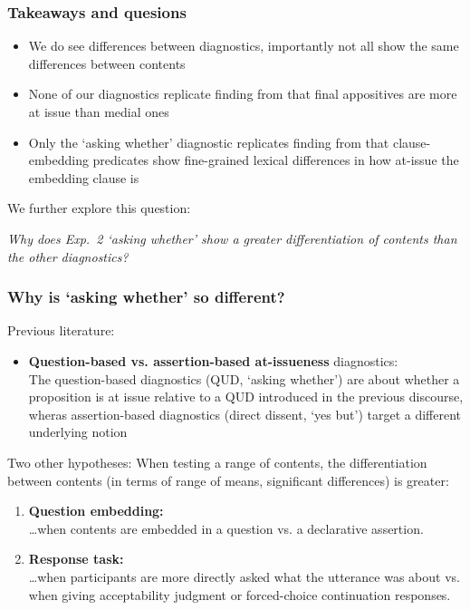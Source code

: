 \documentclass[compress, xcolor = dvipsnames, aspectratio=169, handout]{beamer}
\begin{document}
	\begin{frame}\frametitle{Takeaways and quesions}
		\begin{itemize}
			\item We do see differences between diagnostics, importantly not all show the same differences between contents

			\item None of our diagnostics replicate finding from \citet{syrett_experimental_2015} that final appositives are more at issue than medial ones

			\item Only the `asking whether' diagnostic replicates finding from \citealt{degen-tonhauser-glossa} that clause-embedding predicates show fine-grained lexical differences in how at-issue the embedding clause is

		\end{itemize}	\bigskip

		We further explore this question:

		\begin{center}
			\emph{Why does Exp.~2 `asking whether' show a greater differentiation of contents than the other diagnostics?}
		\end{center}
		
	\end{frame}

	\begin{frame}[t]\frametitle{Why is `asking whether' so different?}\small 
		Previous literature:
		\begin{itemize}
			\item \textbf{Question-based vs. assertion-based at-issueness} diagnostics:\\
				The question-based diagnostics (QUD, `asking whether') are about whether a proposition is at issue relative to a QUD introduced in the previous discourse, wheras assertion-based diagnostics (direct dissent, `yes but') target a different underlying notion
		\end{itemize}
		\vfill 

		Two other hypotheses: When testing a range of contents, the differentiation between contents (in terms of range of means, significant differences) is greater:
		\begin{enumerate}
			\item \textbf{Question embedding:} \\ 
				\dots when contents are embedded in a question vs. a declarative assertion.
				
			\item \textbf{Response task:} \\ \dots when participants are more directly asked what the utterance was about vs. when giving acceptability judgment or forced-choice continuation responses.
			
		\end{enumerate}

	\end{frame}
\end{document}
